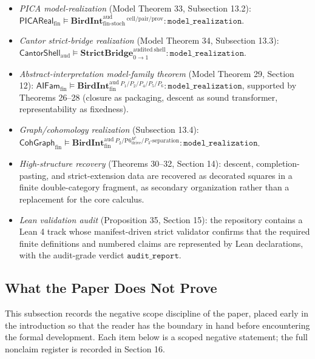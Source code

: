 \documentclass[11pt]{article}
\providecommand{\tightlist}{}
\theoremstyle{definition}
\begin{document}
\begin{itemize}
\tightlist
\item
  \emph{PICA model-realization} (Model Theorem 33, Subsection 13.2): \(\mathsf{PICAReal}_{\mathrm{fin}}\models\mathbf{BirdInt}^{\mathrm{aud}}_{\mathrm{fin\text{-}stoch}}{}^{\,\mathrm{cell}/\mathrm{pair}/\mathrm{prov}}:\texttt{model\_realization}\).
\item
  \emph{Cantor strict-bridge realization} (Model Theorem 34, Subsection 13.3): \(\mathsf{CantorShell}_{\mathrm{aud}}\models\mathbf{StrictBridge}_{0\to 1}^{\mathrm{audited\ shell}}:\texttt{model\_realization}\).
\item
  \emph{Abstract-interpretation model-family theorem} (Model Theorem 29, Section 12): \(\mathsf{AIFam}_{\mathrm{fin}}\models\mathbf{BirdInt}^{\mathrm{aud}}_{\mathrm{fin}}{}^{\,P_{1}/P_{2}/P_{4}/P_{5}/P_{6}}:\texttt{model\_realization}\), supported by Theorems 26--28 (closure as packaging, descent as sound transformer, representability as fixedness).
\item
  \emph{Graph/cohomology realization} (Subsection 13.4): \(\mathsf{CohGraph}_{\mathrm{fin}}\models\mathbf{BirdInt}^{\mathrm{aud}}_{\mathrm{fin}}{}^{\,P_{2}/\mathrm{P6}_{\mathrm{drive}}^{H^{1}}/P_{3}\text{-separation}}:\texttt{model\_realization}\).
\item
  \emph{High-structure recovery} (Theorems 30--32, Section 14): descent, completion-pasting, and strict-extension data are recovered as decorated squares in a finite double-category fragment, as secondary organization rather than a replacement for the core calculus.
\item
  \emph{Lean validation audit} (Proposition 35, Section 15): the repository contains a Lean 4 track whose manifest-driven strict validator confirms that the required finite definitions and numbered claims are represented by Lean declarations, with the audit-grade verdict \(\texttt{audit\_report}\).
\end{itemize}

\subsection{What the Paper Does Not Prove}

This subsection records the negative scope discipline of the paper, placed early in the introduction so that the reader has the boundary in hand before encountering the formal development. Each item below is a scoped negative statement; the full nonclaim register is recorded in Section 16.
\end{document}
